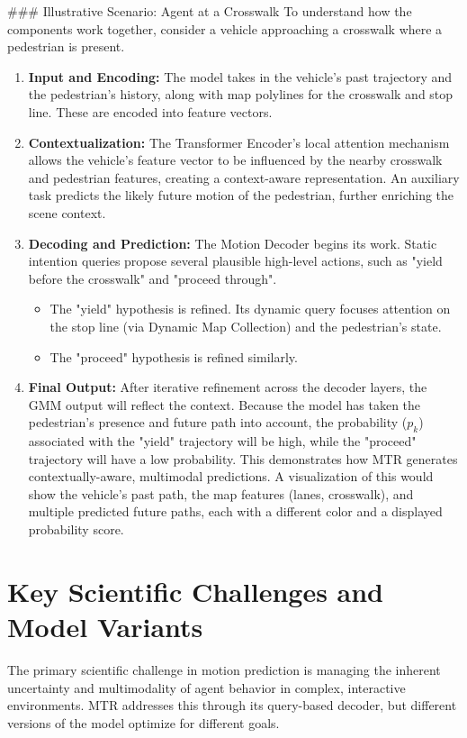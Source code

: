 ### Illustrative Scenario: Agent at a Crosswalk
To understand how the components work together, consider a vehicle approaching a crosswalk where a pedestrian is present.
\begin{enumerate}
    \item \textbf{Input and Encoding:} The model takes in the vehicle's past trajectory and the pedestrian's history, along with map polylines for the crosswalk and stop line. These are encoded into feature vectors.
    \item \textbf{Contextualization:} The Transformer Encoder's local attention mechanism allows the vehicle's feature vector to be influenced by the nearby crosswalk and pedestrian features, creating a context-aware representation. An auxiliary task predicts the likely future motion of the pedestrian, further enriching the scene context.
    \item \textbf{Decoding and Prediction:} The Motion Decoder begins its work. Static intention queries propose several plausible high-level actions, such as "yield before the crosswalk" and "proceed through".
        \begin{itemize}
            \item The "yield" hypothesis is refined. Its dynamic query focuses attention on the stop line (via Dynamic Map Collection) and the pedestrian's state.
            \item The "proceed" hypothesis is refined similarly.
        \end{itemize}
    \item \textbf{Final Output:} After iterative refinement across the decoder layers, the GMM output will reflect the context. Because the model has taken the pedestrian's presence and future path into account, the probability ($p_k$) associated with the "yield" trajectory will be high, while the "proceed" trajectory will have a low probability. This demonstrates how MTR generates contextually-aware, multimodal predictions. A visualization of this would show the vehicle's past path, the map features (lanes, crosswalk), and multiple predicted future paths, each with a different color and a displayed probability score.
\end{enumerate}

\section{Key Scientific Challenges and Model Variants}

The primary scientific challenge in motion prediction is managing the inherent uncertainty and multimodality of agent behavior in complex, interactive environments. MTR addresses this through its query-based decoder, but different versions of the model optimize for different goals.

